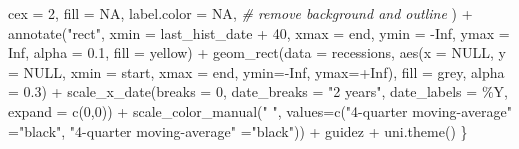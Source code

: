 \documentclass[
]{article}
\newenvironment{Shaded}{\begin{snugshade}}{\end{snugshade}}
\newcommand{\AttributeTok}[1]{\textcolor[rgb]{0.77,0.63,0.00}{#1}}
\newcommand{\CommentTok}[1]{\textcolor[rgb]{0.56,0.35,0.01}{\textit{#1}}}
\newcommand{\ConstantTok}[1]{\textcolor[rgb]{0.00,0.00,0.00}{#1}}
\newcommand{\DecValTok}[1]{\textcolor[rgb]{0.00,0.00,0.81}{#1}}
\newcommand{\FloatTok}[1]{\textcolor[rgb]{0.00,0.00,0.81}{#1}}
\newcommand{\FunctionTok}[1]{\textcolor[rgb]{0.00,0.00,0.00}{#1}}
\newcommand{\NormalTok}[1]{#1}
\newcommand{\OtherTok}[1]{\textcolor[rgb]{0.56,0.35,0.01}{#1}}
\newcommand{\SpecialCharTok}[1]{\textcolor[rgb]{0.00,0.00,0.00}{#1}}
\newcommand{\StringTok}[1]{\textcolor[rgb]{0.31,0.60,0.02}{#1}}
\begin{document}
\begin{Shaded}
\begin{Highlighting}[]
                \AttributeTok{cex =} \DecValTok{2}\NormalTok{, }
                \AttributeTok{fill =} \ConstantTok{NA}\NormalTok{, }\AttributeTok{label.color =} \ConstantTok{NA}\NormalTok{, }\CommentTok{\# remove background and outline}
\NormalTok{      ) }\SpecialCharTok{+}
      \FunctionTok{annotate}\NormalTok{(}\StringTok{"rect"}\NormalTok{, }\AttributeTok{xmin =}\NormalTok{ last\_hist\_date }\SpecialCharTok{+} \DecValTok{40}\NormalTok{, }\AttributeTok{xmax =}\NormalTok{ end,}
               \AttributeTok{ymin =} \SpecialCharTok{{-}}\ConstantTok{Inf}\NormalTok{, }\AttributeTok{ymax =} \ConstantTok{Inf}\NormalTok{, }\AttributeTok{alpha =} \FloatTok{0.1}\NormalTok{, }\AttributeTok{fill =} \StringTok{\textquotesingle{}yellow\textquotesingle{}}\NormalTok{) }\SpecialCharTok{+}
      \FunctionTok{geom\_rect}\NormalTok{(}\AttributeTok{data =}\NormalTok{ recessions,}
                \FunctionTok{aes}\NormalTok{(}\AttributeTok{x =} \ConstantTok{NULL}\NormalTok{, }\AttributeTok{y =} \ConstantTok{NULL}\NormalTok{,}
                    \AttributeTok{xmin =}\NormalTok{ start, }\AttributeTok{xmax =}\NormalTok{ end, }
                    \AttributeTok{ymin=}\SpecialCharTok{{-}}\ConstantTok{Inf}\NormalTok{, }\AttributeTok{ymax=}\SpecialCharTok{+}\ConstantTok{Inf}\NormalTok{), }\AttributeTok{fill =} \StringTok{\textquotesingle{}grey\textquotesingle{}}\NormalTok{, }\AttributeTok{alpha =} \FloatTok{0.3}\NormalTok{) }\SpecialCharTok{+}
      \FunctionTok{scale\_x\_date}\NormalTok{(}\AttributeTok{breaks =} \DecValTok{0}\NormalTok{, }\AttributeTok{date\_breaks =} \StringTok{"2 years"}\NormalTok{, }\AttributeTok{date\_labels =} \StringTok{\textquotesingle{}\%Y\textquotesingle{}}\NormalTok{,}
                   \AttributeTok{expand =} \FunctionTok{c}\NormalTok{(}\DecValTok{0}\NormalTok{,}\DecValTok{0}\NormalTok{)) }\SpecialCharTok{+} 
      \FunctionTok{scale\_color\_manual}\NormalTok{(}\StringTok{" "}\NormalTok{, }
                         \AttributeTok{values=}\FunctionTok{c}\NormalTok{(}\StringTok{"4{-}quarter moving{-}average"} \OtherTok{=}\StringTok{"black"}\NormalTok{,}
                                  \StringTok{"4{-}quarter moving{-}average"} \OtherTok{=}\StringTok{"black"}\NormalTok{)) }\SpecialCharTok{+}
\NormalTok{      guidez }\SpecialCharTok{+}
      \FunctionTok{uni.theme}\NormalTok{() }
\NormalTok{  \}}


\end{Highlighting}
\end{Shaded}
\end{document}
